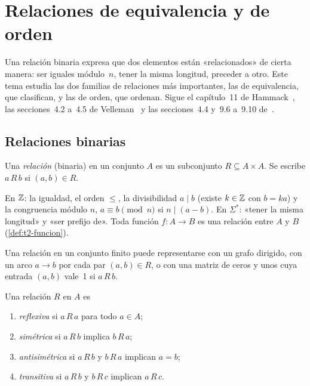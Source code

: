 \chapter{Relaciones de equivalencia y de orden}
\label{tema:5}

Una relación binaria expresa que dos elementos están «relacionados» de cierta manera: ser iguales módulo~$n$, tener la misma longitud, preceder a otro. Este tema estudia las dos familias de relaciones más importantes, las de equivalencia, que clasifican, y las de orden, que ordenan. Sigue el capítulo~11 de Hammack~\cite{hammack}, las secciones~4.2 a~4.5 de Velleman~\cite{velleman} y las secciones~4.4 y~9.6 a~9.10 de~\cite{mcs}.

\section{Relaciones binarias}

\begin{definicion}[Relación]
Una \emph{relación} (binaria) en un conjunto $A$ es un subconjunto $R\subseteq A\times A$. Se escribe $a\,R\,b$ si $(a,b)\in R$.
\end{definicion}

\begin{ejemplo}
En $\mathbb{Z}$: la igualdad, el orden $\le$, la divisibilidad $a\mid b$ (existe $k\in\mathbb{Z}$ con $b=ka$) y la congruencia módulo $n$, $a\equiv b\pmod n$ si $n\mid(a-b)$. En $\Sigma^{*}$: «tener la misma longitud» y «ser prefijo de». Toda función $f\colon A\to B$ es una relación entre $A$ y $B$ (\cref{def:t2-funcion}).
\end{ejemplo}

Una relación en un conjunto finito puede representarse con un grafo dirigido, con un arco $a\to b$ por cada par $(a,b)\in R$, o con una matriz de ceros y unos cuya entrada $(a,b)$ vale~1 si $a\,R\,b$.

\begin{definicion}[Propiedades]\label{def:t5-prop}
Una relación $R$ en $A$ es
\begin{enumerate}
  \item \emph{reflexiva} si $a\,R\,a$ para todo $a\in A$;
  \item \emph{simétrica} si $a\,R\,b$ implica $b\,R\,a$;
  \item \emph{antisimétrica} si $a\,R\,b$ y $b\,R\,a$ implican $a=b$;
  \item \emph{transitiva} si $a\,R\,b$ y $b\,R\,c$ implican $a\,R\,c$.
\end{enumerate}
\end{definicion}

